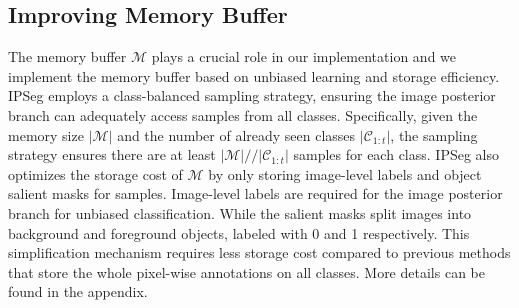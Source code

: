 \subsection{Improving Memory Buffer}


The memory buffer \(\mathcal{M}\) plays a crucial role in our implementation and we implement the memory buffer based on unbiased learning and storage efficiency. 
IPSeg employs a class-balanced sampling strategy, ensuring the image posterior branch can adequately access samples from all classes. Specifically, given the memory size \(\left|\mathcal{M}\right|\) and the number of already seen classes \(\left|\mathcal{C}_{1:t}\right|\), the sampling strategy ensures there are at least \(\left|\mathcal{M}\right|//\left|\mathcal{C}_{1:t}\right|\) samples for each class.
IPSeg also optimizes the storage cost of $\mathcal{M}$ by only storing image-level labels and object salient masks for samples. Image-level labels are required for the image posterior branch for unbiased classification. While the salient masks split images into background and foreground objects, labeled with 0 and 1 respectively. This simplification mechanism requires less storage cost compared to previous methods that store the whole pixel-wise annotations on all classes. More details can be found in the appendix.


